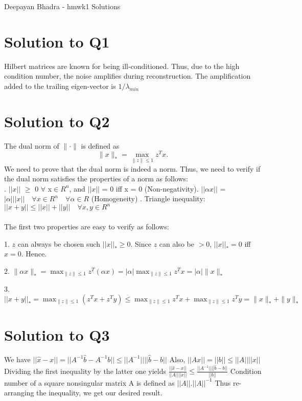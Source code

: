 \documentclass{article}
\begin{document}
\begin{center}{\huge  Deepayan Bhadra - hmwk1 Solutions}\end{center}

\section*{Solution to Q1}

Hilbert matrices are known for being ill-conditioned. Thus, due to the high condition number, the noise amplifies during reconstruction. The amplification added to the trailing eigen-vector is $1/\lambda_{min}$ 


\section*{Solution to Q2}
The dual norm of $\|\cdot\|$ is defined as
$$\|x\|_*  = \max_{\|z\|\le 1} z^Tx.$$
We need to prove that the dual norm is indeed a norm. Thus, we need to verify if the dual norm satisfies the properties of a norm as follows:\\ . $||x||$  $\geq$ 0 $\forall$ x$\in R^n$, and $||x||$ = 0 iff x = 0 (Non-negativity). $||\alpha x||$ = $|\alpha|||x|| \quad\forall x \in R^n \quad\forall \alpha \in R$ (Homogeneity) . Triangle inequality: $||x+y|| \leq ||x|| + ||y|| \quad \forall x,y \in R^n$
\\\\
The first two properties are easy to verify as follows: \newline

1. $z$ can always be chosen such $||x||_* \geq 0$. Since $z$ can also be $> 0$, $||x||_*=0$ iff $x=0$. Hence.    

2. $\|\alpha x\|_*  = \max_{\|z\|\le 1} z^T (\alpha x) = |\alpha| \max_{\|z\|\le 1} z^Tx = |\alpha|\|x\|_* $

3. $||x+y||_* = \max_{\|z\|\le 1} (z^Tx + z^Ty) \leq  \max_{\|z\|\le 1} z^Tx +  \max_{\|z\|\le 1} z^Ty = \|x\|_* + \|y\|_*$


\section*{Solution to Q3}

We have $||\hat{x} - x|| = ||A^{-1} \hat{b} - A^{-1} b|| \leq ||A^{-1}||||\hat{b}-b|| $ \newline \newline Also, $||Ax|| = ||b|| \leq ||A||||x|| $ \newline \newline Dividing the first inequality by the latter one yields \newline \newline $\frac{||\hat{x}-x||}{||A||||x||} \leq \frac{||A^{-1}||||\hat{b}-b||}{||b||} $ \newline \newline Condition number of a square nonsingular matrix A is defined as $||A||.||A||^{-1}$ \newline Thus re-arranging the inequality, we get our desired result. 
\end{document}
